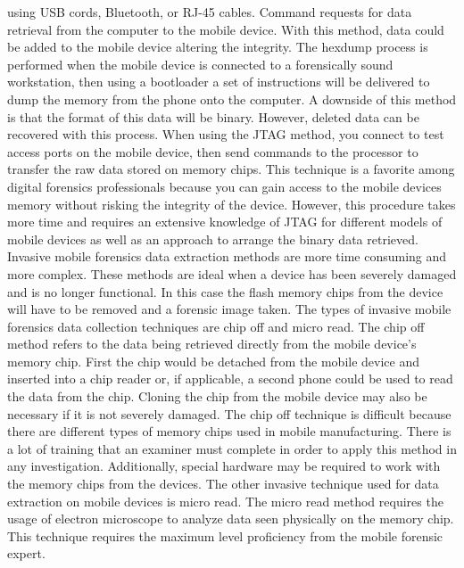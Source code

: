 \documentclass[acmlarge]{style/acmart}
\begin{document}
using USB cords, Bluetooth, or RJ-45 cables.  Command requests for data retrieval from the computer to the mobile device.  With this method, data could be added to the mobile device altering the integrity.  The hexdump process is performed when the mobile device is connected to a forensically sound workstation, then using a bootloader a set of instructions will be delivered to dump the memory from the phone onto the computer.  A downside of this method is that the format of this data will be binary.  However, deleted data can be recovered with this process.  When using the JTAG method, you connect to test access ports on the mobile device, then send commands to the processor to transfer the raw data stored on memory chips.  This technique is a favorite among digital forensics professionals because you can gain access to the mobile devices memory without risking the integrity of the device.  However, this procedure takes more time and requires an extensive knowledge of JTAG for different models of mobile devices as well as an approach to arrange the binary data retrieved.  Invasive mobile forensics data extraction methods are more time consuming and more complex.  These methods are ideal when a device has been severely damaged and is no longer functional.  In this case the flash memory chips from the device will have to be removed and a forensic image taken.  The types of invasive mobile forensics data collection techniques are chip off and micro read.  The chip off method refers to the data being retrieved directly from the mobile device’s memory chip.  First the chip would be detached from the mobile device and inserted into a chip reader or, if applicable, a second phone could be used to read the data from the chip.  Cloning the chip from the mobile device may also be necessary if it is not severely damaged. The chip off technique is difficult because there are different types of memory chips used in mobile manufacturing.  There is a lot of training that an examiner must complete in order to apply this method in any investigation.  Additionally, special hardware may be required to work with the memory chips from the devices.  The other invasive technique used for data extraction on mobile devices is micro read.  The micro read method requires the usage of electron microscope to analyze data seen physically on the memory chip.  This technique requires the maximum level proficiency from the mobile forensic expert.  
\end{document}
